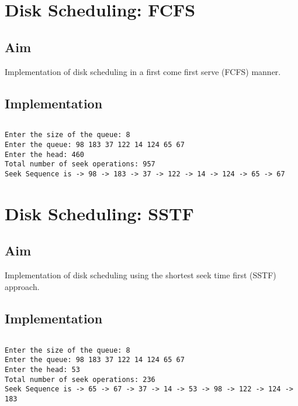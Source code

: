 \section{Disk Scheduling: FCFS}
\label{sec:disk-fcfs}

\subsection{Aim}
Implementation of disk scheduling in a
first come first serve (FCFS) manner.

\subsection{Implementation}

\inputminted[fontsize=\footnotesize,autogobble]{c}{code/disk_fcfs.c}

\begin{lstlisting}[style=output]
Enter the size of the queue: 8
Enter the queue: 98 183 37 122 14 124 65 67
Enter the head: 460
Total number of seek operations: 957
Seek Sequence is -> 98 -> 183 -> 37 -> 122 -> 14 -> 124 -> 65 -> 67
\end{lstlisting}


\section{Disk Scheduling: SSTF}
\label{sec:disk-sstf}

\subsection{Aim}
Implementation of disk scheduling using the
shortest seek time first (SSTF) approach.

\subsection{Implementation}

\inputminted[fontsize=\footnotesize,autogobble]{c}{code/disk_sstf.c}

\begin{lstlisting}[style=output]
Enter the size of the queue: 8
Enter the queue: 98 183 37 122 14 124 65 67
Enter the head: 53
Total number of seek operations: 236
Seek Sequence is -> 65 -> 67 -> 37 -> 14 -> 53 -> 98 -> 122 -> 124 -> 183
\end{lstlisting}
